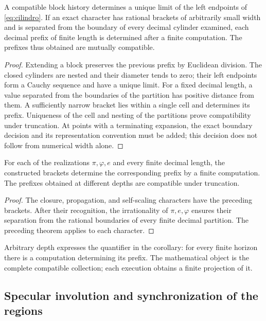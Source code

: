 \begin{theorem}
A compatible block history determines a unique limit of the left endpoints of \eqref{eq:cilindro}. If an exact character has rational brackets of arbitrarily small width and is separated from the boundary of every decimal cylinder examined, each decimal prefix of finite length is determined after a finite computation. The prefixes thus obtained are mutually compatible.
\end{theorem}
\begin{proof}
Extending a block preserves the previous prefix by Euclidean division. The closed cylinders are nested and their diameter tends to zero; their left endpoints form a Cauchy sequence and have a unique limit. For a fixed decimal length, a value separated from the boundaries of the partition has positive distance from them. A sufficiently narrow bracket lies within a single cell and determines its prefix. Uniqueness of the cell and nesting of the partitions prove compatibility under truncation. At points with a terminating expansion, the exact boundary decision and its representation convention must be added; this decision does not follow from numerical width alone.
\end{proof}

\begin{corollary}
\label{gen:prefijos-regionales}
For each of the realizations \(\pi,\varphi,e\) and every finite
decimal length, the constructed brackets determine the corresponding prefix
by a finite computation. The prefixes obtained at different depths
are compatible under truncation.
\end{corollary}
\begin{proof}
The closure, propagation, and self-scaling characters have the
preceding brackets. After their recognition, the irrationality of \(\pi,e,\varphi\)
ensures their separation from the rational boundaries of every finite decimal
partition. The preceding theorem applies to each character.
\end{proof}
Arbitrary depth expresses the quantifier in the corollary: for every
finite horizon there is a computation determining its prefix. The mathematical
object is the complete compatible collection; each execution obtains a
finite projection of it.

\subsection{Specular involution and synchronization of the regions}

